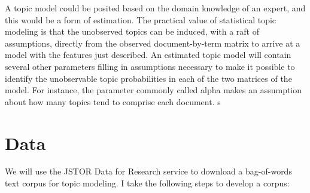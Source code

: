 \documentclass[]{book}
\theoremstyle{definition}
\theoremstyle{definition}
\theoremstyle{definition}
\theoremstyle{remark}
\begin{document}
A topic model could be posited based on the domain knowledge of an
expert, and this would be a form of estimation. The practical value of
statistical topic modeling is that the unobserved topics can be induced,
with a raft of assumptions, directly from the observed document-by-term
matrix to arrive at a model with the features just described. An
estimated topic model will contain several other parameters filling in
assumptions necessary to make it possible to identify the unobservable
topic probabilities in each of the two matrices of the model. For
instance, the parameter commonly called alpha makes an assumption about
how many topics tend to comprise each document. s

\citep{DiMaggio2013Exploiting}

\hypertarget{data}{%
\section{Data}\label{data}}

We will use the JSTOR Data for Research service to download a
bag-of-words text corpus for topic modeling. I take the following steps
to develop a corpus:
\end{document}
